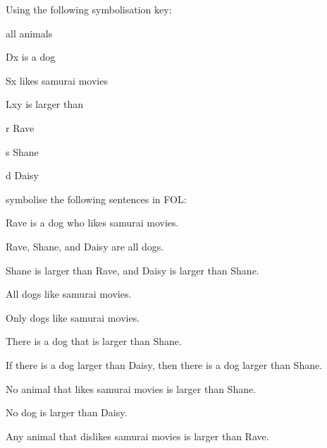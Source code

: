 \problempart 
Using the following symbolisation key:
\begin{ekey}
\item[\text{domain}] all animals
\item[Dx]  is a dog
\item[Sx]  likes samurai movies
\item[Lxy]  is larger than 
\item[r] Rave
\item[s] Shane
\item[d] Daisy
\end{ekey}
symbolise the following sentences in FOL:
\begin{earg}
\item Rave is a dog who likes samurai movies.
\item[] 
\item Rave, Shane, and Daisy are all dogs.
\item[] 
\item Shane is larger than Rave, and Daisy is larger than Shane.
\item[] 
\item All dogs like samurai movies.
\item[] 
\item Only dogs like samurai movies.
\item[] 
\item There is a dog that is larger than Shane.
\item[] 
\item If there is a dog larger than Daisy, then there is a dog larger than Shane.
\item[] 
\item No animal that likes samurai movies is larger than Shane.
\item[] 
\item No dog is larger than Daisy.
\item[] 
\item Any animal that dislikes samurai movies is larger than Rave.

\end{earg}

